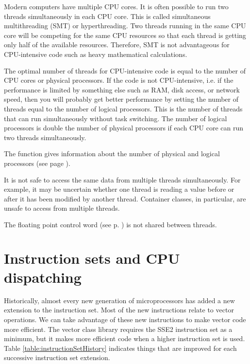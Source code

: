 \documentclass[vcl_manual.tex]{subfiles}
\begin{document}
Modern computers have multiple CPU cores. It is often possible to run two threads simultaneously in each CPU core. This is called simultaneous multithreading (SMT) or hyperthreading. 
Two threads running in the same CPU core will be competing for the same CPU resources so that each thread is getting only half of the available resources. Therefore, SMT is not advantageous for CPU-intensive code such as heavy mathematical calculations. 

The optimal number of threads for CPU-intensive code is equal to the number of CPU cores or physical processors. If the code is not CPU-intensive, i.e. if the performance is limited by something else such as RAM, disk access, or network speed, then you will probably get better performance by setting the number of threads equal to the number of logical processors. This is the number of threads that can run simultaneously without task switching. The number of logical processors is double the number of physical processors if each CPU core can run two threads simultaneously.

The function  gives information about the number of physical and logical processors (see page \pageref{physicalProcessors}).

It is not safe to access the same data from multiple threads simultaneously. For example, it may be uncertain whether one thread is reading a value before or after it has been modified by another thread. Container classes, in particular, are unsafe to access from multiple threads.

The floating point control word (see p. \pageref{FPControlWordManipulationFunctions}) is not shared between threads.


\section{Instruction sets and CPU dispatching}\label{CPUDispatching}
\flushleft

Historically, almost every new generation of microprocessors has added a new extension to the instruction set. Most of the new instructions relate to vector operations. We can take advantage of these new instructions to make vector code more efficient. The vector class library requires the SSE2 instruction set as a minimum, but it makes more efficient code when a higher instruction set is used. Table \ref{table:instructionSetHistory} indicates things that are improved for each successive instruction set extension.
\end{document}

